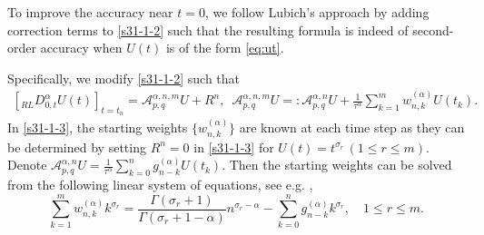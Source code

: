 \documentclass[10pt]{siamltex}
\begin{document}
To improve the accuracy  near $t=0$,  we follow  Lubich's approach \cite{Lub86} by adding correction terms to \eqref{s31-1-2} such that the resulting formula  is indeed of second-order accuracy when $U(t)$ is of the form \eqref{eq:ut}.
\iffalse
avoid the propagation of possible large errors caused near $t=0$.
we need  a quadrature rule that is exact  or at least of order two for
$U(t)=t^{\sigma_r}\,(r=1,2,...)$, where   $\sigma_r$ depends on the problems to be solved.
 \fi
%
Specifically, we modify  \eqref{s31-1-2} such that
\begin{equation}\label{s31-1-3}\begin{aligned}
\left[{}_{RL}D_{0,t}^{\alpha}U(t)\right]_{t=t_n}=\mathcal{{A}}_{p,q}^{\alpha,n,m}U+R^n,\,\,\, \mathcal{{A}}_{p,q}^{\alpha,n,m}U=:\mathcal{A}_{p,q}^{\alpha,n}U
+\frac{1}{\tau^{\alpha}}\sum_{k=1}^mw_{n,k}^{(\alpha)}U(t_k).
\end{aligned}\end{equation}
In \eqref{s31-1-3}, the starting weights $\{w_{n,k}^{(\alpha)}\}$ are known at each time step as they can be determined  by setting   $R^n=0$ in \eqref{s31-1-3} for
$U(t)=t^{\sigma_r}\,(1\leq r \leq m)$.
Denote $\displaystyle\mathcal{A}_{p,q}^{\alpha,n}U=\frac{1}{\tau^{\alpha}}\sum_{k=0}^ng^{(\alpha)}_{n-k}U(t_k)$. Then the starting weights  can be solved from the following linear system of equations, see e.g. \cite{DieFord06,Lub86},
\begin{equation}\label{s31-8}
\sum_{k=1}^mw_{n,k}^{(\alpha)}k^{\sigma_r}
=\frac{\Gamma(\sigma_r+1)}{\Gamma(\sigma_r+1-\alpha)}n^{\sigma_r-\alpha}
-\sum_{k=0}^{n}g^{(\alpha)}_{n-k}k^{\sigma_r},\quad 1\leq r \leq m.
\end{equation}
\end{document}
